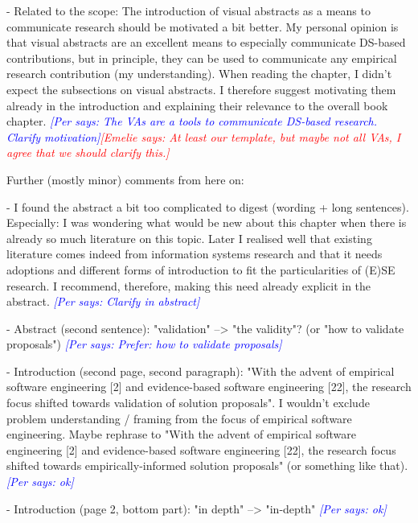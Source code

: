\documentclass{article}
\newcommand{\emelie}[1]{\textcolor{red}{{\it [Emelie says: #1]}}}
\newcommand{\per}[1]{\textcolor{blue}
        	{{\it [Per says: #1]}}}
\newcommand{\emelie}[1]{}
\newcommand{\per}[1]{}
\begin{document}
- Related to the scope: The introduction of visual abstracts as a means to communicate research should be motivated a bit better. My personal opinion is that visual abstracts are an excellent means to especially communicate DS-based contributions, but in principle, they can be used to communicate any empirical research contribution (my understanding). When reading the chapter, I didn't expect the subsections on visual abstracts. I therefore suggest motivating them already in the introduction and explaining their relevance to the overall book chapter. \per{The VAs are a tools to communicate DS-based research. Clarify motivation}\emelie{At least our template, but maybe not all VAs, I agree that we should clarify this.}


Further (mostly minor) comments from here on:

- I found the abstract a bit too complicated to digest (wording + long sentences). Especially: I was wondering what would be new about this chapter when there is already so much literature on this topic. Later I realised well that existing literature comes indeed from information systems research and that it needs adoptions and different forms of introduction to fit the particularities of (E)SE research. I recommend, therefore, making this need already explicit in the abstract. \per{Clarify in abstract}

- Abstract (second sentence): "validation" --> "the validity"? (or "how to validate proposals") \per{Prefer: how to validate proposals}

- Introduction (second page, second paragraph): "With the advent of empirical software engineering [2] and evidence-based software engineering [22], the research focus shifted towards validation of solution proposals". I wouldn't exclude problem understanding / framing from the focus of empirical software engineering. Maybe rephrase to "With the advent of empirical software engineering [2] and evidence-based software engineering [22], the research focus shifted towards empirically-informed solution proposals" (or something like that). \per{ok}

- Introduction (page 2, bottom part): "in depth" --> "in-depth"  \per{ok}
\end{document}
